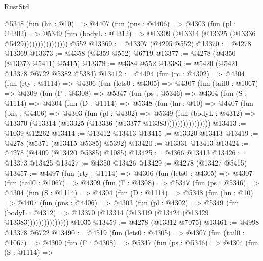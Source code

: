 \begin{lexlean}{RustStd}
\begin{coremodule}
{\begin{coremodule}
{{{{{{{{{{{{{{{{{{{{{{{{{{{{{{{{{{{                    @5348
                      (fun (hn : @10) =>
                      @4407
                        (fun (pns : @4406) =>
                        @4303
                          (fun (pl : @4302) =>
                          @5349
                            (fun (bodyL : @4312) =>
                            @13309 (@13314 (@13325 (@13336 @5429))))))))))))))))
    @552
@13369 := @13307 (@4295 @552)
@13370 := @4278 @13369
@13373 := @4358 (@4359 @552) @6719
@13377 := @4278 (@4350 (@13373 @5411) @5415)
@13378 := @4384 @552
@13383 := @5420 (@5421 @13378 @6722 @5382 @5384)
@13412 := @4494
    (fun (rc : @4302) =>
    @4304
      (fun (rty : @1114) =>
      @4306
        (fun (lets0 : @4305) =>
        @4307
          (fun (tail0 : @1067) =>
          @4309
            (fun (Γ : @4308) =>
            @5347
              (fun (ps : @5346) =>
              @4304
                (fun (S : @1114) =>
                @4304
                  (fun (D : @1114) =>
                  @5348
                    (fun (hn : @10) =>
                    @4407
                      (fun (pns : @4406) =>
                      @4303
                        (fun (pl : @4302) =>
                        @5349
                          (fun (bodyL : @4312) =>
                          @13370 (@13314 (@13325 (@13336 (@13377 @13383))))))))))))))))
@13413 := @1039 @12262
@13414 := @13412 @13413
@13415 := @13320 @13413
@13419 := @4278 (@5371 (@13415 @5385) @5392)
@13420 := @13331 @13413
@13424 := @4278 (@4409 (@13420 @5385) @1085)
@13425 := @4366 @13413
@13426 := @13373 @13425
@13427 := @4350 @13426
@13429 := @4278 (@13427 @5415)
@13457 := @4497
    (fun (rty : @1114) =>
    @4306
      (fun (lets0 : @4305) =>
      @4307
        (fun (tail0 : @1067) =>
        @4309
          (fun (Γ : @4308) =>
          @5347
            (fun (ps : @5346) =>
            @4304
              (fun (S : @1114) =>
              @4304
                (fun (D : @1114) =>
                @5348
                  (fun (hn : @10) =>
                  @4407
                    (fun (pns : @4406) =>
                    @4303
                      (fun (pl : @4302) =>
                      @5349
                        (fun (bodyL : @4312) =>
                        @13370 (@13314 (@13419 (@13424 (@13429 @13383)))))))))))))))
    @1035
@13459 := @4278 (@13312 @7075)
@13461 := @4998 @13378 @6722
@13490 := @4519
    (fun (lets0 : @4305) =>
    @4307
      (fun (tail0 : @1067) =>
      @4309
        (fun (Γ : @4308) =>
        @5347
          (fun (ps : @5346) =>
          @4304
            (fun (S : @1114) =>
}}}}}}}}}}}}}}}}}}}}}}}}}}}}}}}}}}}
\end{coremodule}}
\end{coremodule}
\end{lexlean}

